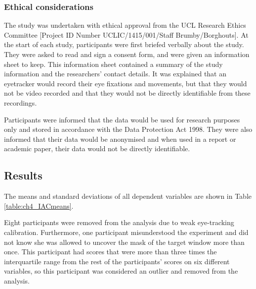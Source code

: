 \documentclass[11pt,oneside]{report}
\begin{document}
\subsubsection{Ethical considerations}
The study was undertaken with ethical approval from the UCL Research Ethics Committee [Project ID Number UCLIC/1415/001/Staff Brumby/Borghouts]. 
At the start of each study, participants were first briefed verbally about the study. They were asked to read and sign a consent form, and were given an information sheet to keep. This information sheet contained a summary of the study information and the researchers' contact details. It was explained that an eyetracker would record their eye fixations and movements, but that they would not be video recorded and that they would not be directly identifiable from these recordings.

Participants were informed that the data would be used for research purposes only and stored in accordance with the Data Protection Act 1998. They were also informed that their data would be anonymised and when used in a report or academic paper, their data would not be directly identifiable. 
 
\subsection{Results}
The means and standard deviations of all dependent variables are shown in Table \ref{table:ch4_IACmeans}.

Eight participants were removed from the analysis due to weak eye-tracking calibration. Furthermore, one participant misunderstood the experiment and did not know she was allowed to uncover the mask of the target window more than once. This participant had scores that were more than three times the interquartile range from the rest of the participants' scores on six different variables, so this participant was considered an outlier and removed from the analysis. 
\end{document}
